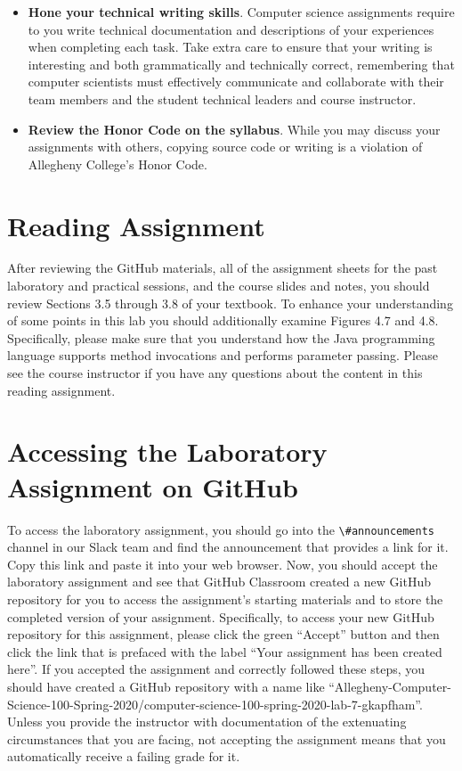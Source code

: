 \documentclass[11pt]{article}
\newcommand{\channel}[1]{\lstinline{#1}}
\begin{document}
\begin{itemize}
\item {\bf Hone your technical writing skills}. Computer science assignments
  require to you write technical documentation and descriptions of your
  experiences when completing each task. Take extra care to ensure that your
  writing is interesting and both grammatically and technically correct,
  remembering that computer scientists must effectively communicate and
  collaborate with their team members and the student technical leaders and
  course instructor.

\item {\bf Review the Honor Code on the syllabus}. While you may discuss your
  assignments with others, copying source code or writing is a violation of
  Allegheny College's Honor Code.

\end{itemize}

\section*{Reading Assignment}

After reviewing the GitHub materials, all of the assignment sheets for the past
laboratory and practical sessions, and the course slides and notes, you should
review Sections 3.5 through 3.8 of your textbook. To enhance your understanding
of some points in this lab you should additionally examine Figures 4.7 and 4.8.
Specifically, please make sure that you understand how the Java programming
language supports method invocations and performs parameter passing. Please see
the course instructor if you have any questions about the content in this
reading assignment.

\section*{Accessing the Laboratory Assignment on GitHub}

To access the laboratory assignment, you should go into the
\channel{\#announcements} channel in our Slack team and find the announcement
that provides a link for it. Copy this link and paste it into your web browser.
Now, you should accept the laboratory assignment and see that GitHub Classroom
created a new GitHub repository for you to access the assignment's starting
materials and to store the completed version of your assignment. Specifically,
to access your new GitHub repository for this assignment, please click the green
``Accept'' button and then click the link that is prefaced with the label ``Your
assignment has been created here''. If you accepted the assignment and correctly
followed these steps, you should have created a GitHub repository with a name
like
``Allegheny-Computer-Science-100-Spring-2020/computer-science-100-spring-2020-lab-7-gkapfham''.
Unless you provide the instructor with documentation of the extenuating
circumstances that you are facing, not accepting the assignment means that you
automatically receive a failing grade for it.
\end{document}
